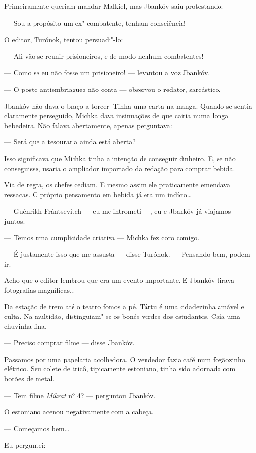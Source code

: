 Primeiramente queriam mandar Malkiel, mas Jbankóv saiu protestando:

--- Sou a propósito um ex"-combatente, tenham consciência!

O editor, Turónok, tentou persuadi"-lo:

--- Ali vão se reunir prisioneiros, e de modo nenhum combatentes!

--- Como se eu não fosse um prisioneiro! --- levantou a voz Jbankóv.

--- O posto antiembriaguez não conta --- observou o redator, sarcástico.

Jbankóv não dava o braço a torcer. Tinha uma carta na manga. Quando se
sentia claramente perseguido, Michka dava insinuações de que cairia numa
longa bebedeira. Não falava abertamente, apenas perguntava:

--- Será que a tesouraria ainda está aberta?

Isso significava que Michka tinha a intenção de conseguir dinheiro. E,
se não conseguisse, usaria o ampliador importado da redação para comprar
bebida.

Via de regra, os chefes cediam. E mesmo assim ele praticamente emendava
ressacas. O próprio pensamento em bebida já era um indício\ldots{}

--- Guénrikh Frántsevitch --- eu me intrometi ---, eu e Jbankóv já
viajamos juntos.

--- Temos uma cumplicidade criativa --- Michka fez coro comigo.

--- É justamente isso que me assusta --- disse Turónok. --- Pensando
bem, podem ir.

Acho que o editor lembrou que era um evento importante. E Jbankóv tirava
fotografias magníficas\ldots{}

Da estação de trem até o teatro fomos a pé. Tártu é uma cidadezinha
amável e culta. Na multidão, distinguiam"-se os bonés verdes dos
estudantes. Caía uma chuvinha fina.

--- Preciso comprar filme --- disse Jbankóv.

Passamos por uma papelaria acolhedora. O vendedor fazia café num
fogãozinho elétrico. Seu colete de tricô, tipicamente estoniano, tinha
sido adornado com botões de metal.

--- Tem filme \emph{Mikrat} nº 4? --- perguntou Jbankóv.

O estoniano acenou negativamente com a cabeça.

--- Começamos bem\ldots{}

Eu perguntei:

